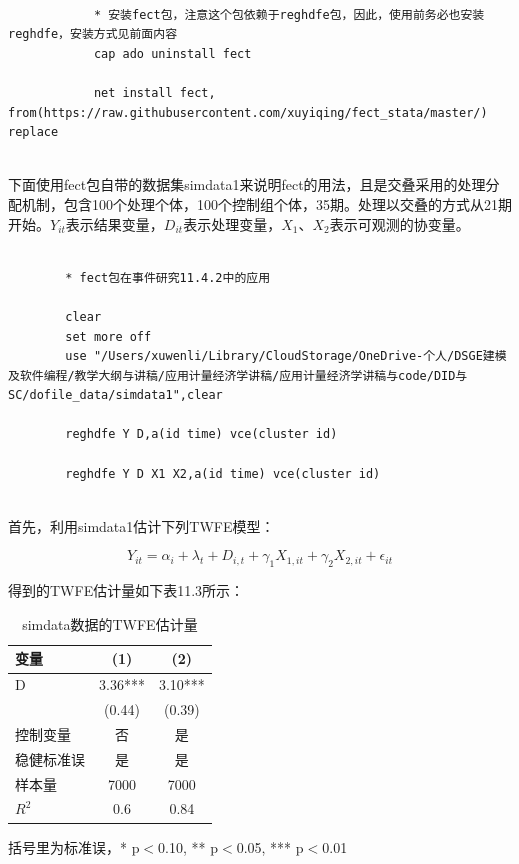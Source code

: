 \documentclass[cn,12pt,math=newtx,citestyle=gb7714-2015,bibstyle=gb7714-2015]{elegantbook}
\begin{document}
		\begin{lstlisting}
			
			* 安装fect包，注意这个包依赖于reghdfe包，因此，使用前务必也安装reghdfe，安装方式见前面内容
			cap ado uninstall fect
			
			net install fect, from(https://raw.githubusercontent.com/xuyiqing/fect_stata/master/) replace
			
		\end{lstlisting}
	
	下面使用fect包自带的数据集simdata1来说明fect的用法，且是交叠采用的处理分配机制，包含100个处理个体，100个控制组个体，35期。处理以交叠的方式从21期开始。$Y_{it}$表示结果变量，$D_{it}$表示处理变量，$X_1$、$X_2$表示可观测的协变量。
	
	
	
	\begin{lstlisting}
		
		* fect包在事件研究11.4.2中的应用
		
		clear
		set more off
		use "/Users/xuwenli/Library/CloudStorage/OneDrive-个人/DSGE建模及软件编程/教学大纲与讲稿/应用计量经济学讲稿/应用计量经济学讲稿与code/DID与SC/dofile_data/simdata1",clear
		
		reghdfe Y D,a(id time) vce(cluster id)
		
		reghdfe Y D X1 X2,a(id time) vce(cluster id)
		
	\end{lstlisting}
	
	首先，利用simdata1估计下列TWFE模型：
	
	\begin{equation}
		Y_{it}=\alpha_i+\lambda_t+D_{i,t}+ \gamma_1 X_{1,it}+\gamma_2X_{2,it}  +\epsilon_{it}
	\end{equation}
	
	得到的TWFE估计量如下表11.3所示：
	
	\begin{table}[htbp]\centering
		\scriptsize
		\caption{simdata数据的TWFE估计量}
		\label{twfe}
		\begin{center}
			\begin{threeparttable}
				\begin{tabular}{lcc}
					\toprule
					\textbf{变量}&\textbf{(1)}&\textbf{(2)}\\
					\midrule
					D               &      3.36***& 3.10***   \\
					&    (0.44)   &(0.39)            \\
					控制变量 &   否 &    是  \\
					稳健标准误&    是    &是           \\
					样本量   & 7000  &7000 \\
					$R^2$    &0.6&0.84
					\\
					\bottomrule
				\end{tabular}
				\begin{tablenotes}
					\tiny
					\item 括号里为标准误，* p$<$0.10, ** p$<$0.05, *** p$<$0.01
				\end{tablenotes}
			\end{threeparttable}
		\end{center}
	\end{table}
	
\end{document}
